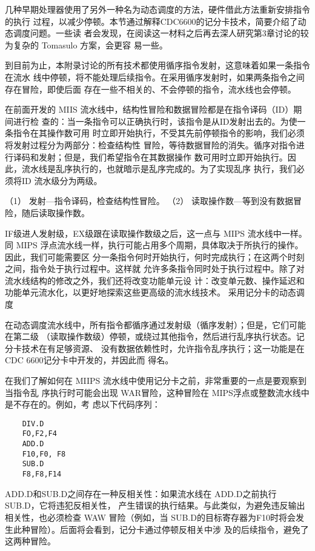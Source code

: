 几种早期处理器使用了另外一种名为动态调度的方法，硬件借此方法重新安排指令的执行
过程，以减少停顿。本节通过解释CDC6600的记分卡技术，简要介绍了动态调度问题。一些读
者会发现，在阅读这一材料之后再去深人研究第3章讨论的较为复杂的 Tomasulo 方案，会更容
易一些。

到目前为止，本附录讨论的所有技术都使用循序指令发射，这意味着如果一条指令在流水
线中停顿，将不能处理后续指令。在采用循序发射时，如果两条指令之间存在冒险，即使后面
存在一些不相关的、不会停顿的指令，流水线也会停顿。

在前面开发的 MIIS 流水线中，结构性冒险和数据冒险都是在指令译码（ID）期间进行检
查的：当一条指令可以正确执行时，该指令是从ID发射出去的。为使一条指令在其操作数可用
时立即开始执行，不受其先前停顿指令的影响，我们必须将发射过程分为两部分：检查结构性
冒险，等待数据冒险的消失。循序对指令进行译码和发射；但是，我们希望指令在其数据操作
数可用时立即开始执行。因此，流水线是乱序执行的，也就暗示是乱序完成的。为了实现乱序
执行，我们必须将ID 流水级分为两级。

（1） 发射—指令译码，检查结构性冒险。
（2） 读取操作数—等到没有数据冒险，随后读取操作数。

IF级进人发射级，EX级跟在读取操作数级之后，这一点与 MIPS 流水线中一样。同 MIPS
浮点流水线一样，执行可能占用多个周期，具体取决于所执行的操作。因此，我们可能需要区
分一条指令何时开始执行，何时完成执行；在这两个时刻之间，指令处于执行过程中。这样就
允许多条指令同时处于执行过程中。除了对流水线结构的修改之外，我们还将改变功能单元设
计：改变单元数、操作延迟和功能单元流水化，以更好地探索这些更高级的流水线技术。
采用记分卡的动态调度

在动态调度流水线中，所有指令都循序通过发射级（循序发射）；但是，它们可能在第二级
（读取操作数级）停顿，或绕过其他指令，然后进行乱序执行状态。记分卡技术在有足够资源、
没有数据依赖性时，允许指令乱序执行；这一功能是在CDC 6600记分卡中开发的，并因此而
得名。

在我们了解如何在 MIIPS 流水线中使用记分卡之前，非常重要的一点是要观察到当指令乱
序执行时可能会出现 WAR冒险，这种冒险在 MIPS浮点或整数流水线中是不存在的。例如，考
虑以下代码序列：

\begin{verbatim}
    DIV.D
    FO,F2,F4
    ADD.D
    F10,F0, F8
    SUB.D
    F8,F8,F14
\end{verbatim}

ADD.D和SUB.D之间存在一种反相关性：如果流水线在 ADD.D之前执行 SUB.D，它将违犯反相关性，
产生错误的执行结果。与此类似，为避免违反输出相关性，也必须检查 WAW 冒险（例如，当
SUB.D的目标寄存器为F10时将会发生此种冒险）。后面将会看到，记分卡通过停顿反相关中涉
及的后续指令，避免了这两种冒险。


